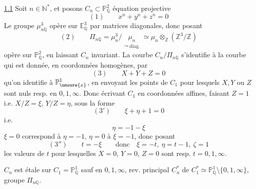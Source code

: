 \uline{1.1} Soit $n\in\mathbb N^*$, et posons
$C_n\subset\mathbb P^2_{\mathbb Q}$ équation projective
\[
(1)\qquad x^n+y^n+z^n=0
\]
Le groupe $\mu_{n\mathbb Q}^3$ opère sur $\mathbb E^3_{\mathbb Q}$ par matrices diagonales,
donc posant
\[
(2)\qquad \Pi_{n\mathbb Q}=\mu_n^3/\underset{\substack{\curvearrowright\,\text{diag.}}}{\mu_n}
\simeq\mu_n\otimes_{\mathbb Z}(\mathbb Z^3/\mathbb Z)
\]
opère sur $\mathbb P^2_{\mathbb Q}$, en laissant $C_n$ invariant. La courbe
$C_n/\Pi_{n\mathbb Q}$ s'identifie à la courbe  qui est donnée,
en coordonnées homogènes, par
\[
(3)\qquad X+Y+Z=0
\]
qu'on identifie à $\mathbb P^1_{\unsure{x}}$, en envoyant les points de $C_1$
pour lesquels $X,Y$ ou $Z$ sont nuls resp. en $0,1,\infty$.
Donc écrivant $C_1$ en coordonnées affines, faisant $Z=1$
i.e. $X/Z=\xi$, $Y/Z=\eta$, sous la forme
\[
(3')\qquad \xi+\eta+1=0
\]
i.e.
\[
\eta=-1-\xi
\]
$\xi=0$ correspond à $\eta=-1$, $\eta=0$ à $\xi=-1$, donc posant
\[
(3'')\qquad t=-\xi\qquad\text{donc}\quad \xi=-t,\ \eta=t-1,\ \zeta=1
\]
les valeurs de $t$ pour lesquelles $X=0$, $Y=0$, $Z=0$ sont resp. $t=0,1,\infty$.

$C_n$ est étale sur $C_1=\mathbb P^1_{\mathbb Q}$ sauf en $0,1,\infty$, 
 rev. principal $C_n^*$ de $C_1^*\simeq\mathbb P^1_{\mathbb Q}\setminus\{0,1,\infty\}$,
groupe $\Pi_{n\mathbb Q}$.
